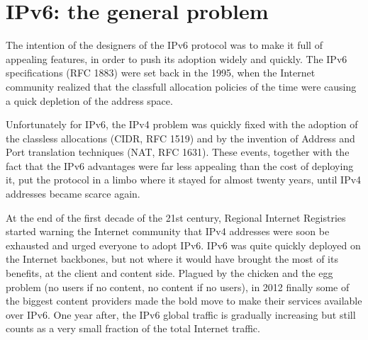 \section{IPv6: the general problem}

The intention of the designers of the IPv6 protocol was to make it full of appealing features, in order to push its adoption widely and quickly. The IPv6 specifications (RFC 1883) were set back in the 1995, when the Internet community realized that the classfull allocation policies of the time were causing a quick depletion of the address space. 
\par
Unfortunately for IPv6, the IPv4 problem was quickly fixed with the adoption of the classless allocations (CIDR, RFC 1519) and by the invention of Address and Port translation techniques (NAT, RFC 1631). These events, together with the fact that the IPv6 advantages were far less appealing than the cost of deploying it, put the protocol in a limbo where it stayed for almost twenty years, until IPv4 addresses became scarce again.
\par
At the end of the first decade of the 21st century, Regional Internet Registries started warning the Internet community that IPv4 addresses were soon be exhausted and urged everyone to adopt IPv6. IPv6 was quite quickly deployed on the Internet backbones, but not where it would have brought the most of its benefits, at the client and content side. 
Plagued by the chicken and the egg problem (no users if no content, no content if no users), in 2012 finally some of the 
biggest content providers made the bold move to make their services available over IPv6. 
One year after, the IPv6 global traffic is gradually increasing but still counts as a very small fraction of the 
total Internet traffic.

